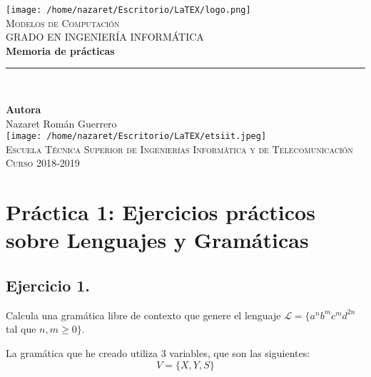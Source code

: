 \documentclass[11pt,a4paper]{article}
\begin{document}
\begin{titlepage}

\begin{minipage}{\textwidth}

\centering
\texttt{[image: /home/nazaret/Escritorio/LaTEX/logo.png]}\\

\textsc{\Large Modelos de Computación\\[0.2cm]}
\textsc{GRADO EN INGENIERÍA INFORMÁTICA}\\[1cm]

{\Huge\bfseries Memoria de prácticas\\}
\noindent\rule[-1ex]{\textwidth}{3pt}\\[3.5ex]
{\large\bfseries}
\end{minipage}

\vspace{1.5cm}
\begin{minipage}{\textwidth}
\centering

\textbf{Autora}\\ {Nazaret Román Guerrero}\\[2.5ex]
\texttt{[image: /home/nazaret/Escritorio/LaTEX/etsiit.jpeg]}\\[0.1cm]
\vspace{1cm}
\textsc{Escuela Técnica Superior de Ingenierías Informática y de Telecomunicación}\\
\vspace{1cm}
\textsc{Curso 2018-2019}
\end{minipage}
\end{titlepage}

\tableofcontents
\thispagestyle{empty}

\newpage

\section{Práctica 1: Ejercicios prácticos sobre Lenguajes y Gramáticas}
\subsection{Ejercicio 1.} Calcula una gramática libre de contexto que genere el lenguaje $\mathcal{L}=\{a^nb^mc^md^{2n}$ tal que $n,m\geq 0\}$.

La gramática que he creado utiliza 3 variables, que son las siguientes:
	\[V=\{X,Y,S\}\]
	
\end{document}
